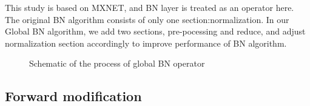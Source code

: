 



This study is based on MXNET, and BN layer is treated as an operator here. The original BN algorithm consists of only one section:normalization. In our Global BN algorithm, we add two sections, pre-pocessing and reduce, and adjust normalization section accordingly to improve performance of BN algorithm.

\begin{figure}[h]
    \begin{center}
    \caption{Schematic of the process of global BN operator }%
    \label{fig:Memonger}
    \end{center}
\end{figure}

\subsection{Forward modification}

